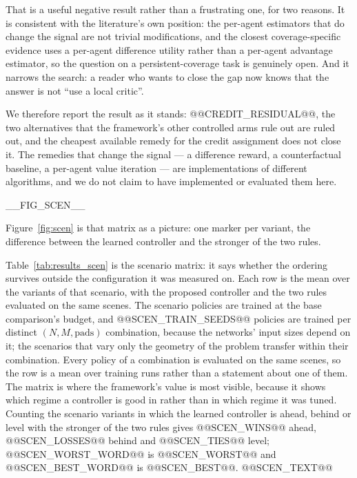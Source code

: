 That is a useful negative result rather than a frustrating one, for two
reasons.  It is consistent with the literature's own position: the
per-agent estimators that do change the signal are not trivial
modifications, and the closest coverage-specific evidence
\cite{sun2023} uses a per-agent difference utility rather than a per-agent
advantage estimator, so the question on a persistent-coverage task is
genuinely open.  And it narrows the search: a reader who wants to close
the gap now knows that the answer is not ``use a local critic''.

We therefore report the result as it stands: @@CREDIT_RESIDUAL@@, the two
alternatives that the framework's other controlled arms rule out are ruled
out, and the cheapest available remedy for the credit assignment does not
close it.  The remedies that change the
signal --- a difference reward, a counterfactual baseline, a per-agent
value iteration --- are implementations of different algorithms, and we do
not claim to have implemented or evaluated them here.


__FIG_SCEN__

Figure~\ref{fig:scen} is that matrix as a picture: one marker per variant, the difference between the learned controller and the stronger of the two rules.

Table~\ref{tab:results_scen} is the scenario matrix: it says whether the ordering survives outside the configuration it was measured on. Each row is the mean over the variants of that scenario, with the proposed
controller and the two rules evaluated on the same scenes.  The scenario
policies are trained at the base comparison's budget, and
@@SCEN_TRAIN_SEEDS@@ policies are trained per distinct $(N, M, \text{pads})$ combination, because
the networks' input sizes depend on it; the scenarios that vary only the
geometry of the problem transfer within their combination.  Every policy
of a combination is evaluated on the same scenes, so the row is a mean
over training runs rather than a statement about one of them.  The matrix is
where the framework's value is most visible, because it shows
which regime a controller is good in rather than in which regime it was
tuned.  Counting the scenario variants in which the learned controller is
ahead, behind or level with the stronger of the two rules gives
@@SCEN_WINS@@ ahead,
@@SCEN_LOSSES@@ behind and @@SCEN_TIES@@ level; @@SCEN_WORST_WORD@@ is
@@SCEN_WORST@@ and @@SCEN_BEST_WORD@@ is @@SCEN_BEST@@.  @@SCEN_TEXT@@
